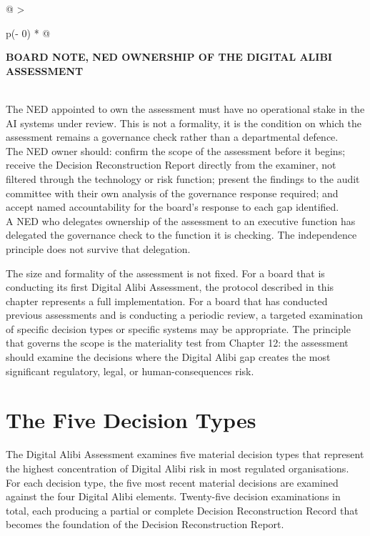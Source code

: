 \begin{longtable}[]{@{}
  >{\raggedright\arraybackslash}p{(\columnwidth - 0\tabcolsep) * }@{}}
\toprule\noalign{}
\begin{minipage}[b]{\linewidth}\raggedright
\textbf{BOARD NOTE, NED OWNERSHIP OF THE DIGITAL ALIBI ASSESSMENT}
\end{minipage} \\
\midrule\noalign{}
\endhead
\bottomrule\noalign{}
\endlastfoot
The NED appointed to own the assessment must have no operational stake in the AI systems under review. This is not a formality, it is the condition on which the assessment remains a governance check rather than a departmental defence. \\
The NED owner should: confirm the scope of the assessment before it begins; receive the Decision Reconstruction Report directly from the examiner, not filtered through the technology or risk function; present the findings to the audit committee with their own analysis of the governance response required; and accept named accountability for the board's response to each gap identified. \\
A NED who delegates ownership of the assessment to an executive function has delegated the governance check to the function it is checking. The independence principle does not survive that delegation. \\
\end{longtable}

The size and formality of the assessment is not fixed. For a board that is conducting its first Digital Alibi Assessment, the protocol described in this chapter represents a full implementation. For a board that has conducted previous assessments and is conducting a periodic review, a targeted examination of specific decision types or specific systems may be appropriate. The principle that governs the scope is the materiality test from Chapter 12: the assessment should examine the decisions where the Digital Alibi gap creates the most significant regulatory, legal, or human-consequences risk.

\scenebreak

\section{The Five Decision Types}

The Digital Alibi Assessment examines five material decision types that represent the highest concentration of Digital Alibi risk in most regulated organisations. For each decision type, the five most recent material decisions are examined against the four Digital Alibi elements. Twenty-five decision examinations in total, each producing a partial or complete Decision Reconstruction Record that becomes the foundation of the Decision Reconstruction Report.

